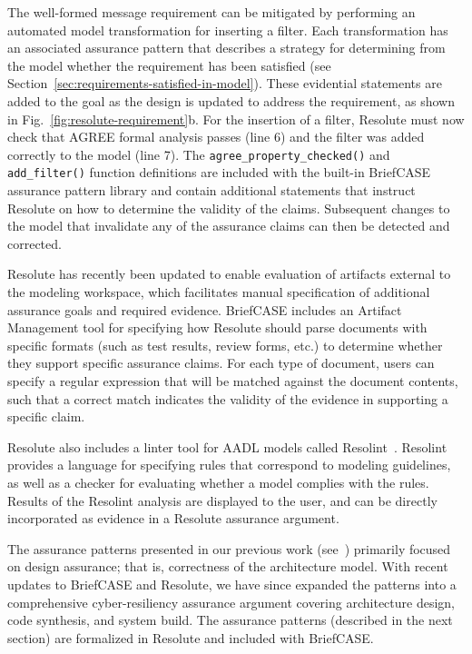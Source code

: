 The well-formed message requirement can be mitigated by performing an automated model transformation for inserting a filter. Each transformation has an associated assurance pattern that describes a strategy for determining from the model whether the requirement has been satisfied (see Section~\ref{sec:requirements-satisfied-in-model}).  
These evidential statements are added to the goal as the design is updated to address the requirement, as shown in Fig.~\ref{fig:resolute-requirement}b.  For the insertion of a filter, Resolute must now check that AGREE formal analysis passes (line 6) and the filter was added correctly to the model (line 7).  The \texttt{agree\_property\_checked()} and \texttt{add\_filter()} function definitions are included with the built-in BriefCASE assurance pattern library and contain additional statements that instruct Resolute on how to determine the validity of the claims. 
Subsequent changes to the model that invalidate any of the assurance claims can then be detected and corrected.  

Resolute has recently been updated to enable evaluation of artifacts external to the modeling workspace, which facilitates manual specification of additional assurance goals and required evidence. BriefCASE includes an Artifact Management tool for specifying how Resolute should parse documents with specific formats (such as test results, review forms, etc.) to determine whether they support specific assurance claims.  For each type of document, users can specify a regular expression that will be matched against the document contents, such that a correct match indicates the validity of the evidence in supporting a specific claim.

Resolute also includes a linter tool for AADL models called Resolint~\cite{resolint}. Resolint provides a language for specifying rules that correspond to modeling guidelines, as well as a checker for evaluating whether a model complies with the rules. Results of the Resolint analysis are displayed to the user, and can be directly incorporated as evidence in a Resolute assurance argument.

The assurance patterns presented in our previous work (see~\cite{resolute-destion}) primarily focused on design assurance; that is, correctness of the architecture model.  With recent updates to BriefCASE and Resolute, we have since expanded the patterns into a comprehensive cyber-resiliency assurance argument covering architecture design, code synthesis, and system build.  The assurance patterns (described in the next section) are formalized in Resolute and included with BriefCASE.
